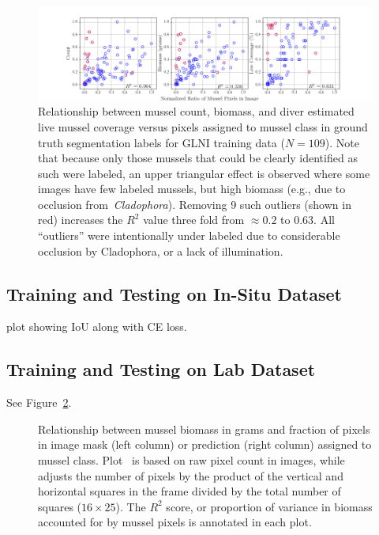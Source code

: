 \documentclass[11pt]{article} %
\begin{document}
\begin{figure}
\centering
\includegraphics[width=0.9\linewidth]{img/Train-all-109-annotate-outliers}
\caption{Relationship between mussel count, biomass, and diver estimated live
mussel coverage versus pixels assigned to mussel class in ground truth
segmentation labels for GLNI training data ($N=109$). Note that because only 
those mussels that could be clearly identified as such were labeled, an upper 
triangular effect is observed where some images have few labeled mussels, 
but high biomass (e.g., due to occlusion from~\emph{Cladophora}). Removing 9 
such outliers (shown in red) increases the $R^2$ value three fold from $\approx
0.2$ to $0.63$. All ``outliers'' were intentionally under labeled due to
considerable occlusion by Cladophora, or a lack of illumination.}
\label{fig:train-biomass-from-labels}
\end{figure}


\subsection{Training and Testing on In-Situ Dataset}

plot showing IoU along with CE loss.


\subsection{Training and Testing on Lab Dataset}

See Figure~\ref{fig:lab-to-lab-biomass-from-pixels}.

\newcommand{\labtolab}{./img/lab_to_lab/}

\begin{figure}
\centering
{}
\caption{Relationship between mussel biomass in grams and fraction of pixels in 
image mask (left column) or prediction (right column) assigned to mussel class.
Plot~ is based on raw pixel count in images, 
while~ adjusts the number of pixels by the
product of the vertical and horizontal squares in the frame divided by the 
total number of squares ($16 \times 25$). The $R^2$ score, or proportion of
variance in biomass accounted for by mussel pixels is annotated in each plot.}
\label{fig:lab-to-lab-biomass-from-pixels}
\end{figure}
\end{document}
